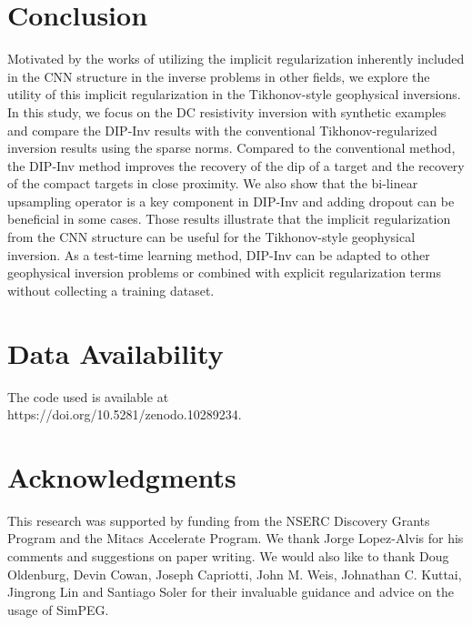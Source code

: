\documentclass[lettersize,journal]{IEEEtran}
\begin{document}
\section{Conclusion}
Motivated by the works of utilizing the implicit regularization inherently included in the CNN structure in the inverse problems in other fields, we explore the utility of this implicit regularization in the Tikhonov-style geophysical inversions. In this study, we focus on the DC resistivity inversion with synthetic examples and compare the DIP-Inv results with the conventional Tikhonov-regularized inversion results using the sparse norms. Compared to the conventional method, the DIP-Inv method improves the recovery of the dip of a target and the recovery of the compact targets in close proximity. We also show that the bi-linear upsampling operator is a key component in DIP-Inv and adding dropout can be beneficial in some cases. Those results illustrate that the implicit regularization from the CNN structure can be useful for the Tikhonov-style geophysical inversion. As a test-time learning method, DIP-Inv can be adapted to other geophysical inversion problems or combined with explicit regularization terms without collecting a training dataset.

\section*{Data Availability}
The code used is available at \\https://doi.org/10.5281/zenodo.10289234.

\section*{Acknowledgments}
This research was supported by funding from the NSERC Discovery Grants Program and the Mitacs Accelerate Program. We thank Jorge Lopez-Alvis for his comments and suggestions on paper writing. We would also like to thank Doug Oldenburg, Devin Cowan, Joseph Capriotti, John M. Weis, Johnathan C. Kuttai, Jingrong Lin and Santiago Soler for their invaluable guidance and advice on the usage of SimPEG. 
\end{document}
